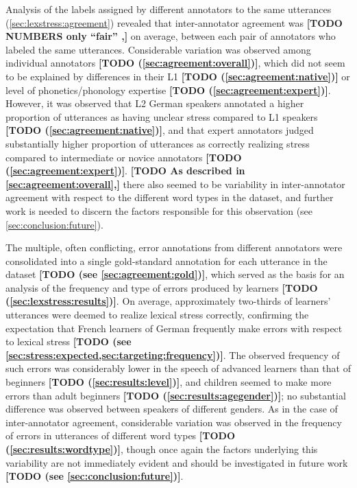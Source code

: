 \documentclass[11pt,a4paper,onecolumn]{article}
\newcommand{\TODO}[1]{{\color{red}\textbf{[TODO #1]}}}
\begin{document}
	Analysis of the labels assigned by different annotators to the same utterances (\cref{sec:lexstress:agreement}) revealed that inter-annotator agreement was \TODO{NUMBERS 
	only ``fair'' %
	\citep{Landis1977},} on average, between each pair of annotators who labeled the same utterances. 
	Considerable variation was observed among individual annotators \TODO{(\cref{sec:agreement:overall})}, which did not seem to be explained by differences 
	in their L1 \TODO{(\cref{sec:agreement:native})} or level of 
	phonetics/phonology expertise \TODO{(\cref{sec:agreement:expert})}. 
	However, it was observed that
	L2 German speakers annotated a higher proportion of utterances as having unclear stress compared to L1 speakers \TODO{(\cref{sec:agreement:native})}, and that expert annotators judged substantially higher proportion of utterances as correctly realizing stress compared to intermediate or novice annotators \TODO{(\cref{sec:agreement:expert})}.
	\TODO{As described in \cref{sec:agreement:overall},} there also seemed to be variability in inter-annotator 
	agreement with respect to the different word types %
	in the dataset, and further work is needed to discern the factors responsible for this observation (see \cref{sec:conclusion:future}). 
	
	The multiple, often conflicting, error annotations from different annotators were consolidated into a single gold-standard annotation for each utterance in the dataset \TODO{(see \cref{sec:agreement:gold})}, which served as the basis for an analysis of the frequency and type of errors produced by learners \TODO{(\cref{sec:lexstress:results})}. 
	On average, approximately two-thirds of learners' utterances were deemed to realize lexical stress correctly, confirming the expectation that French learners of German frequently make errors with respect to lexical stress \TODO{(see \cref{sec:stress:expected,sec:targeting:frequency})}.
	The observed frequency of such errors was considerably lower in the speech of advanced learners than that of beginners \TODO{(\cref{sec:results:level})}, and children seemed to make more errors than adult beginners \TODO{(\cref{sec:results:agegender})}; no substantial difference was observed between speakers of different genders. 
	As in the case of inter-annotator agreement, considerable variation was observed in the frequency of errors in utterances of different word types \TODO{(\cref{sec:results:wordtype})}, though once again the factors underlying this variability are not immediately evident and should be investigated in future work \TODO{(see \cref{sec:conclusion:future})}.
	
\end{document}
